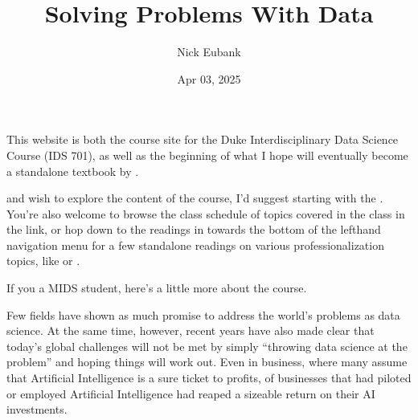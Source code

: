 \documentclass[letterpaper,10pt,english]{jupyterBook}
\title{Solving Problems With Data}
\date{Apr 03, 2025}
\author{Nick Eubank}
\begin{document}
\pagestyle{empty}
\sphinxmaketitle
\pagestyle{plain}
\sphinxtableofcontents
\pagestyle{normal}
\label{\detokenize{landing_page::doc}}


\sphinxAtStartPar
This website is both the course site for the Duke Interdisciplinary Data Science Course  (IDS 701), as well as the beginning of what I hope will eventually become a stand\sphinxhyphen{}alone textbook by .

\sphinxAtStartPar
{} and wish to explore the content of the course, I’d suggest starting with the {\hyperref[\detokenize{10_introduction/10_solving_problems_with_data::doc}]{}}. You’re also welcome to browse the class schedule of topics covered in the class in the {\hyperref[\detokenize{00_class_schedule/class_schedule::doc}]{}} link, or hop down to the readings in  towards the bottom of the left\sphinxhyphen{}hand navigation menu for a few stand\sphinxhyphen{}alone readings on various professionalization topics, like {\hyperref[\detokenize{40_in_practice/25_writing_to_stakeholders::doc}]{}} or {\hyperref[\detokenize{40_in_practice/30_giving_feedback::doc}]{}}.

\sphinxAtStartPar
If you  a MIDS student, here’s a little more about the course.

\begin{DUlineblock}{0em}
\item[] 
\end{DUlineblock}

\sphinxAtStartPar
Few fields have shown as much promise to address the world’s problems as data science. At the same time, however, recent years have also made clear that today’s global challenges will not be met by simply “throwing data science at the problem” and hoping things will work out. Even in business, where many assume that Artificial Intelligence is a sure ticket to profits,  of businesses that had piloted or employed Artificial Intelligence had reaped a sizeable return on their AI investments.
\end{document}
